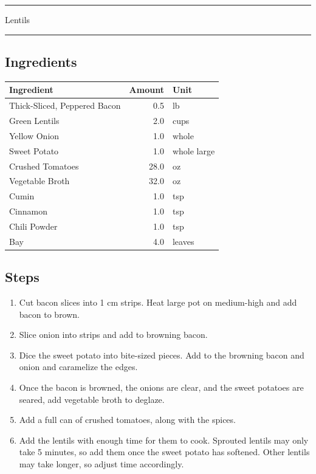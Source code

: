 \documentclass[11pt,]{article}
\begin{document}
\hrule  \vspace{5 mm}

\HUGE Lentils \normalsize\vspace{5 mm} \hrule 

\subsection{Ingredients}\label{ingredients-3}

\begin{tabular}{l|r|l}
\hline
Ingredient & Amount & Unit\\
\hline
Thick-Sliced, Peppered Bacon & 0.5 & lb\\
\hline
Green Lentils & 2.0 & cups\\
\hline
Yellow Onion & 1.0 & whole\\
\hline
Sweet Potato & 1.0 & whole large\\
\hline
Crushed Tomatoes & 28.0 & oz\\
\hline
Vegetable Broth & 32.0 & oz\\
\hline
Cumin & 1.0 & tsp\\
\hline
Cinnamon & 1.0 & tsp\\
\hline
Chili Powder & 1.0 & tsp\\
\hline
Bay & 4.0 & leaves\\
\hline
\end{tabular}

\subsection{Steps}\label{steps-3}

\begin{enumerate}
\def\labelenumi{\arabic{enumi}.}
\item
  Cut bacon slices into 1 cm strips. Heat large pot on medium-high and
  add bacon to brown.
\item
  Slice onion into strips and add to browning bacon.
\item
  Dice the sweet potato into bite-sized pieces. Add to the browning
  bacon and onion and caramelize the edges.
\item
  Once the bacon is browned, the onions are clear, and the sweet
  potatoes are seared, add vegetable broth to deglaze.
\item
  Add a full can of crushed tomatoes, along with the spices.
\item
  Add the lentils with enough time for them to cook. Sprouted lentils
  may only take 5 minutes, so add them once the sweet potato has
  softened. Other lentils may take longer, so adjust time accordingly.
\end{enumerate}
\end{document}
